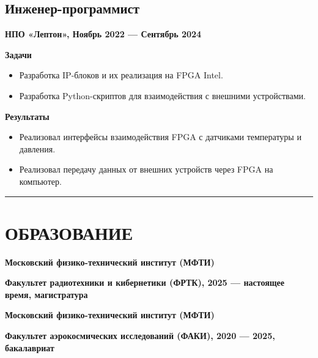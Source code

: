 \documentclass[10pt, a4paper]{article}
\begin{document}
\subsection*{Инженер-программист}

\textbf{НПО «Лептон», Ноябрь 2022 --- Сентябрь 2024}

\textbf{Задачи}

\begin{itemize}
    \item Разработка IP-блоков и их реализация на FPGA Intel.
    \item Разработка Python-скриптов для взаимодействия с внешними устройствами.
\end{itemize}

\textbf{Результаты}

\begin{itemize}
    \item Реализовал интерфейсы взаимодействия FPGA с датчиками температуры и давления.
    \item Реализовал передачу данных от внешних устройств через FPGA на компьютер.
\end{itemize}

\rule{\linewidth}{2pt}


\section*{ОБРАЗОВАНИЕ}

\textbf{Московский физико-технический институт (МФТИ)}

\textbf{Факультет радиотехники и кибернетики (ФРТК), 2025 --- настоящее время, магистратура}

\vspace{4pt}

\textbf{Московский физико-технический институт (МФТИ)}

\textbf{Факультет аэрокосмических исследований (ФАКИ), 2020 --- 2025, бакалавриат}
\end{document}
